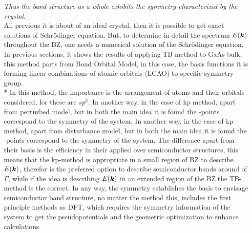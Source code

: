 \emph{Thus the band structure as a whole exhibits the symmetry characterized by the crystal}\cite{bir1974symmetry}.
\\
All previous it is about of an ideal crystal, then it is possible to get exact solutions of Schrödinger equation. But, to determine in detail the spectrum $E(\boldsymbol{k})$ throughout the \gls{BZ}, one needs a numerical solution of the Schrödinger equation. In previous sections, it shows the results of applying \gls{TB} method to GaAs bulk, this method parts from Bond Orbital Model\cite{harrison1973bond,vogl1983asemiempirical,slater1954simplified}, in this case, the basis functions it is forming linear combinations of atomic orbitals (LCAO) to specific symmetry group\cite{dresselhaus2007group}. \\*
In this method, the importance is the arrangement of atoms and their orbitals considered, for  these are $sp^{3}$. 
In another way, in the case of \gls{kp} method, apart from perturbed model, but in both the main idea it is found the \ks-points correspond to the symmetry of the system. In another way, in the case of \gls{kp} method, apart from disturbance model, but in both the main idea it is found the \ks-points correspond to the symmetry of the system. The difference apart from their basis is the efficiency in their applied over semiconductor structures, this means that the \gls{kp}-method is appropriate in a small region of \gls{BZ} to describe $E{(\boldsymbol{k} )}$, therefor is the preferred option to describe semiconductor bands around of $\Gamma$, while if the idea is describing $E{(\boldsymbol{k})}$ in an extended region of the \gls{BZ} the \gls{TB}-method is the correct\cite{dresselhaus2007group,bir1974symmetry}. In any way, the symmetry establishes the basis to envisage semiconductor band structure, no matter the method this, includes the first principle methods as DFT, which requires the symmetry information of the system to get the pseudopotentials and the geometric optimization to enhance calculations.
